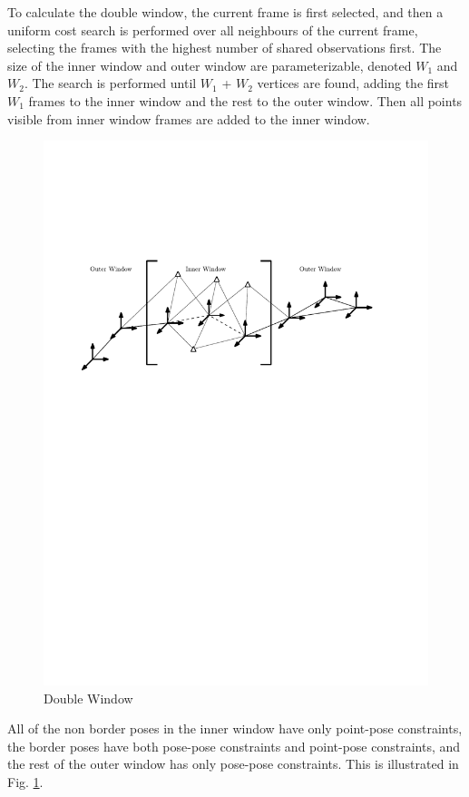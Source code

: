 To calculate the double window, the current frame is first selected, and then a uniform cost search is performed over all neighbours of the current frame, selecting the frames with the highest number of shared observations first. The size of the inner window and outer window are parameterizable, denoted $W_1$ and $W_2$. The search is performed until $W_1$ + $W_2$ vertices are found, adding the first $W_1$ frames to the inner window and the rest to the outer window. Then all points visible from inner window frames are added to the inner window.  

\begin{figure}[h!]
  \centering
    \includegraphics[width=1.0\textwidth]{chapters/images/double_win}
  \caption{Double Window}
  \label{fig:double_window}
\end{figure}

All of the non border poses in the inner window have only point-pose constraints, the border poses have both pose-pose constraints and point-pose constraints, and the rest of the outer window has only pose-pose constraints.  This is illustrated in Fig. \ref{fig:double_window}.  

